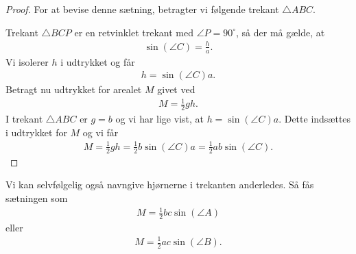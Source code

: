 \begin{proof}
	For at bevise denne sætning, betragter vi følgende trekant $\triangle ABC$.
	\begin{center}
	\end{center}
	Trekant $\triangle BCP$ er en retvinklet trekant med $\angle P = 90^\circ$, så der må gælde, at 
	\begin{align*}
		\sin(\angle C) = \frac{h}{a}.
	\end{align*}
	Vi isolerer $h$ i udtrykket og får
	\begin{align*}
		h = \sin(\angle C)a.
	\end{align*}
	Betragt nu udtrykket for arealet $M$ givet ved
	\begin{align*}
		M = \frac{1}{2}gh.
	\end{align*}
	I trekant $\triangle ABC$ er $g = b$ og vi har lige vist, at $h = \sin(\angle C)a$. Dette indsættes i 
	udtrykket for $M$ og vi får
	\begin{align*}
		M = \frac{1}{2}gh = \frac{1}{2}b\sin(\angle C)a = \frac{1}{2}ab\sin(\angle C).
	\end{align*}
\end{proof}
Vi kan selvfølgelig også navngive hjørnerne i trekanten anderledes. Så fås sætningen som
\begin{align*}
	M = \frac{1}{2}bc\sin(\angle A)
\end{align*}
eller
\begin{align*}
	M = \frac{1}{2}ac\sin(\angle B).
\end{align*}
